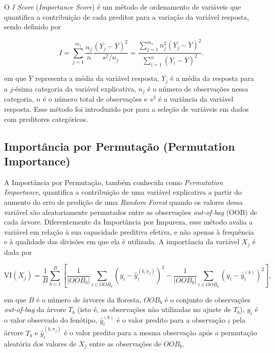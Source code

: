 \documentclass[12pt,fleqn]{article}
\newcommand{\citeonline}[1]{\citet{#1}}
\begin{document}
O \textit{I Score} (\textit{Importance Score}) é um método de ordenamento de variáveis que quantifica a contribuição de cada preditor para a variação da variável resposta, sendo definido por

\begin{equation}
    I=\sum_{j=1}^{m_1} \frac{n_j}{n} \frac{(\overline{Y_j}-\overline{Y})^2}{s^2/n_j} =
    \frac{\sum_{j=1}^{m_1} n_j^2 (\overline{Y_j}-\overline{Y})^2}
    {\sum_{i=1}^{n}(Y_i-\overline{Y})^2}.
\end{equation}

\noindent em que $\overline{Y}$ representa a média da variável resposta, $\overline{Y_j}$ é a média da resposta para a $j$-ésima categoria da variável explicativa, $n_j$ é o número de observações nessa categoria, $n$ é o número total de observações e $s^2$ é a variância da variável resposta. Esse método foi introduzido por \citeonline{Lo2015} para a seleção de variáveis em dados com preditores categóricos.

\subsection{Importância por Permutação (Permutation Importance)}

A Importância por Permutação, também conhecida como \textit{Permutation Importance}, quantifica a contribuição de uma variável explicativa a partir do aumento do erro de predição de uma \textit{Random Forest} quando os valores dessa variável são aleatoriamente permutados entre as observações \textit{out-of-bag} (OOB) de cada árvore. Diferentemente da Importância por Impureza, esse método avalia a variável em relação à sua capacidade preditiva efetiva, e não apenas à frequência e à qualidade das divisões em que ela é utilizada. A importância da variável $X_j$ é dada por

\begin{equation}
    \text{VI}(X_j) = \frac{1}{B} \sum_{b=1}^{B} \left[ \frac{1}{|OOB_b|} \sum_{i \in OOB_b} \left(y_i - \hat{y}_i^{(b,\pi_j)}\right)^2 - \frac{1}{|OOB_b|} \sum_{i \in OOB_b} \left(y_i - \hat{y}_i^{(b)}\right)^2 \right],
\end{equation}

\noindent em que $B$ é o número de árvores da floresta, $OOB_b$ é o conjunto de observações \textit{out-of-bag} da árvore $T_b$ (isto é, as observações não utilizadas no ajuste de $T_b$), $y_i$ é o valor observado do fenótipo, $\hat{y}_i^{(b)}$ é o valor predito para a observação $i$ pela árvore $T_b$ e $\hat{y}_i^{(b,\pi_j)}$ é o valor predito para a mesma observação após a permutação aleatória dos valores de $X_j$ entre as observações de $OOB_b$.
\end{document}
